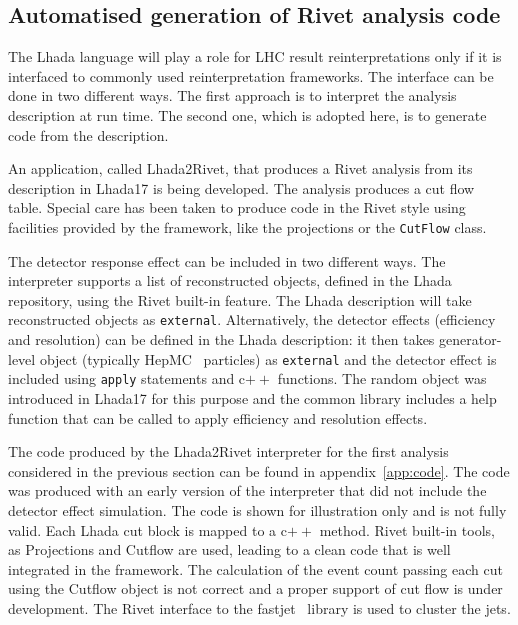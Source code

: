 \documentclass[11pt]{cernrep}
\begin{document}
\subsection{Automatised generation of Rivet analysis code}

The {\sc Lhada} language will play a role for LHC result reinterpretations only if it is interfaced to commonly used reinterpretation frameworks. The interface can be done in two different ways. The first approach is to interpret the analysis description at run time. The second one, which is adopted here, is to generate code from the description.

An application, called {\sc Lhada2Rivet}, that produces a Rivet analysis from its description in {\sc Lhada17} is being developed. The analysis produces a cut flow table. Special care has been taken to produce code in the {\sc Rivet} style using facilities provided by the framework, like the projections or the {\tt CutFlow} class.

The detector response effect can be included in two different ways. The interpreter supports a list of reconstructed objects, defined in the {\sc Lhada} repository, using the {\sc Rivet} built-in feature. The {\sc Lhada} description will take reconstructed objects as {\tt external}. Alternatively, the detector effects (efficiency and resolution) can be defined in the {\sc Lhada} description: it then takes generator-level object (typically {\sc HepMC}~\cite{Dobbs:2001ck} particles) as {\tt external} and the detector effect is included using {\tt apply} statements and c$++$ functions. The random object was introduced in {\sc Lhada17} for this purpose and the common library includes a help function that can be called to apply efficiency and resolution effects.

The code produced by the {\sc Lhada2Rivet} interpreter for the first analysis considered in the previous section can be found in appendix~\ref{app:code}. The code was produced with an early version of the interpreter that did not include the detector effect simulation. The code is shown for illustration only and is not fully valid. Each {\sc Lhada} cut block is mapped to a c$++$ method. {\sc Rivet} built-in tools, as Projections and Cutflow are used, leading to a clean code that is well integrated in the framework. The calculation of the event count passing each cut using the Cutflow object is not correct and a proper support of cut flow is under development.  The {\sc Rivet} interface to the fastjet~\cite{Cacciari:2011ma} library is used to cluster the jets.
\end{document}
